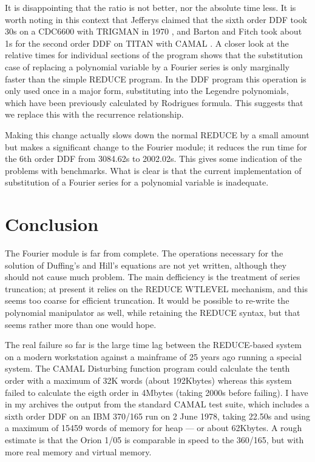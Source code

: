 It is disappointing that the ratio is not better, nor the absolute
time less.  It is worth noting in this context that Jefferys claimed
that the sixth order DDF took 30s on a CDC6600 with TRIGMAN in 1970
\cite{Jefferys}, and Barton and Fitch took about 1s for the second
order DDF on TITAN with CAMAL \cite{Barton72}.  A closer look at the
relative times for individual sections of the program shows that the
substitution case of replacing a polynomial variable by a Fourier
series is only marginally faster than the simple REDUCE program.  In
the DDF program this operation is only used once in a major form,
substituting into the Legendre polynomials, which have been previously
calculated by Rodrigues formula.  This suggests that we replace this
with the recurrence relationship.

Making this change actually slows down the normal REDUCE by a small
amount but makes a significant change to the Fourier module; it
reduces the run time for the 6th order DDF from 3084.62s to 2002.02s.
This gives some indication of the problems with benchmarks.  What is
clear is that the current implementation of substitution of a Fourier
series for a polynomial variable is inadequate.

\section{Conclusion}

The Fourier module is far from complete.  The operations necessary for
the solution of Duffing's and Hill's equations are not yet written,
although they should not cause much problem.  The main defficiency is
the treatment of series truncation; at present it relies on the REDUCE
WTLEVEL mechanism, and this seems too coarse for efficient truncation.
It would be possible to re-write the polynomial manipulator as well,
while retaining the REDUCE syntax, but that seems rather more than one
would hope.

The real failure so far is the large time lag between the REDUCE-based
system on a modern workstation against a mainframe of 25 years ago
running a special system.  The CAMAL Disturbing function program could
calculate the tenth order with a maximum of 32K words (about
192Kbytes) whereas this system failed to calculate the eigth order in
4Mbytes (taking 2000s before failing).  I have in my archives the
output from the standard CAMAL test suite, which includes a sixth
order DDF on an IBM 370/165 run on 2 June 1978, taking 22.50s and
using a maximum of 15459 words of memory for heap --- or about
62Kbytes.  A rough estimate is that the Orion 1/05 is comparable in
speed to the 360/165, but with more real memory and virtual memory.

